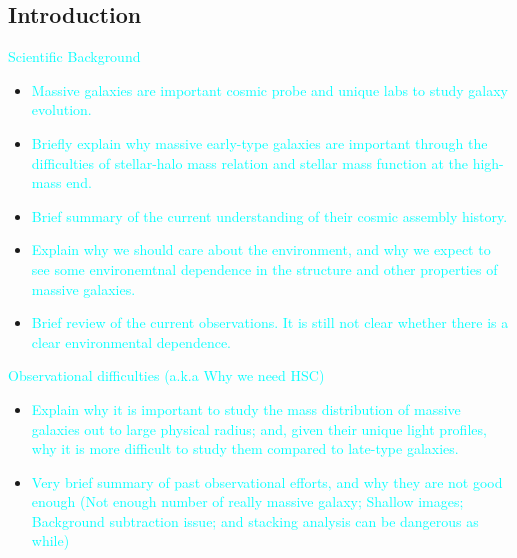 \documentclass[preprint]{aastex}
\newcommand{\plan}[1]{\textcolor{cyan}{#1}}
\begin{document}
\begin{CJK*}{UTF8}{gbsn}
\maketitle


\section{Introduction}

    \plan{Scientific Background}
    \begin{itemize}
        \item \plan{Massive galaxies are important cosmic probe and unique labs to study 
            galaxy evolution.} 
        \item \plan{Briefly explain why massive early-type galaxies are important through 
            the difficulties of stellar-halo mass relation and stellar mass function at the 
            high-mass end.}
        \item \plan{Brief summary of the current understanding of their cosmic assembly 
            history.}
        \item \plan{Explain why we should care about the environment, and why we expect to 
            see some environemtnal dependence in the structure and other properties of
            massive galaxies.}
        \item \plan{Brief review of the current observations.  It is still not clear 
            whether there is a clear environmental dependence.}
    \end{itemize}

    \plan{Observational difficulties (a.k.a Why we need HSC)}
    \begin{itemize}
        \item \plan{Explain why it is important to study the mass distribution of 
            massive galaxies out to large physical radius; and, given their unique light 
            profiles, why it is more difficult to study them compared to late-type 
            galaxies.}
        \item \plan{Very brief summary of past observational efforts, and why they are not 
            good enough (Not enough number of really massive galaxy; Shallow images; 
            Background subtraction issue; and stacking analysis can be dangerous as while)}
    \end{itemize}
    

\end{CJK*}
\end{document}

